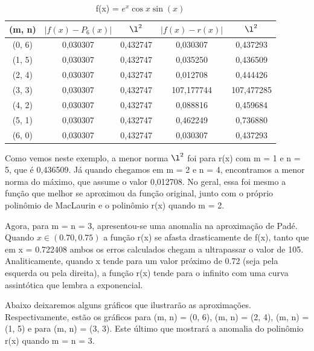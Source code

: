 \documentclass{article}
\begin{document}
    \begin{table}[h]
        \centering
        \caption{f(x) = $e^{x}\cos{x}\sin(x)$}
        \label{tab:my_table}
            \begin{tabular}{|c|c|c|c|c|} \hline 
                 (m, n)&  $\left | f(x) - P_{6}(x) \right |$&  $\l^{2}$&  $ \left |f(x) - r(x) \right |$& $\l^2$\\ \hline 
                 (0, 6)&  0,030307&  0,432747&  0,030307& 0,437293\\ \hline 
                 (1, 5)&  0,030307&  0,432747&  0,035250& 0,436509\\ \hline 
                 (2, 4)&  0,030307&  0,432747&  0,012708& 0,444426\\ \hline 
                 (3, 3)&  0,030307&  0,432747&  107,177744& 107,477285\\ \hline 
                 (4, 2)&  0,030307&  0,432747&  0,088816& 0,459684\\ \hline 
                 (5, 1)&  0,030307&  0,432747&  0,462249& 0,736880\\ \hline 
                 (6, 0)&  0,030307&  0,432747&  0,030307& 0,437293\\ \hline
            \end{tabular}
    \end{table}

    Como vemos neste exemplo, a menor norma $\l^2$ foi para r(x) com m = 1 e n = 5, que é 0,436509.
    Já quando chegamos em m = 2 e n = 4, encontramos a menor norma do máximo, que assume o valor 0,012708.
    No geral, essa foi mesmo a função que melhor se aproximou da função original, junto com o próprio
    polinômio de MacLaurin e o polinômio r(x) quando m = 2.

    Agora, para m = n = 3, apresentou-se uma anomalia na aproximação de Padé.
    Quando $x \in (0.70, 0.75)$ a função r(x) se afasta drasticamente de f(x), tanto que em x = 0.722408
    ambos os erros calculados chegam a ultrapassar o valor de 105. Analiticamente, quando x tende para um valor próximo
    de 0.72 (seja pela esquerda ou pela direita), a função r(x) tende para o infinito com uma curva assintótica que lembra
    a exponencial.
    
    Abaixo deixaremos alguns gráficos que ilustrarão as aproximações. Respectivamente, estão os gráficos para
    (m, n) = (0, 6), (m, n) = (2, 4), (m, n) = (1, 5) e para (m, n) = (3, 3). Este último que mostrará a anomalia
    do polinômio r(x) quando m = n = 3.
    
\end{document}
